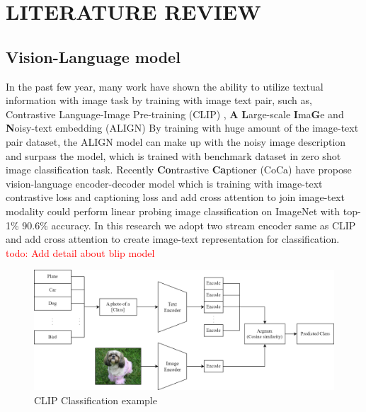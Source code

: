 \chapter{LITERATURE REVIEW}

\section{Vision-Language model}
In the past few year, many work have shown the ability to utilize textual information with image task by training with image text pair, such as, Contrastive Language-Image Pre-training (CLIP) , \textbf{A} \textbf{L}arge-scale \textbf{I}ma\textbf{G}e and \textbf{N}oisy-text embedding (ALIGN)  By training with huge amount of the image-text pair dataset, the ALIGN model can make up with the noisy image description and surpass the model, which is trained with benchmark dataset in zero shot image classification task. Recently \textbf{Co}ntrastive \textbf{Ca}ptioner (CoCa)  have propose vision-language encoder-decoder model which is training with image-text contrastive loss and captioning loss and add cross attention to join image-text modality could perform linear probing image classification on ImageNet with top-1\% 90.6\% accuracy. In this research we adopt two stream encoder same as CLIP and add cross attention to create image-text representation for classification. \textcolor{red}{todo: Add detail about blip model}

\begin{figure}[h]
\caption{CLIP Classification example}
\label{fig:clip_classification}
\centering
\includegraphics[width=1\textwidth]{Images/CLIPClassification.png}
\small
\end{figure}

